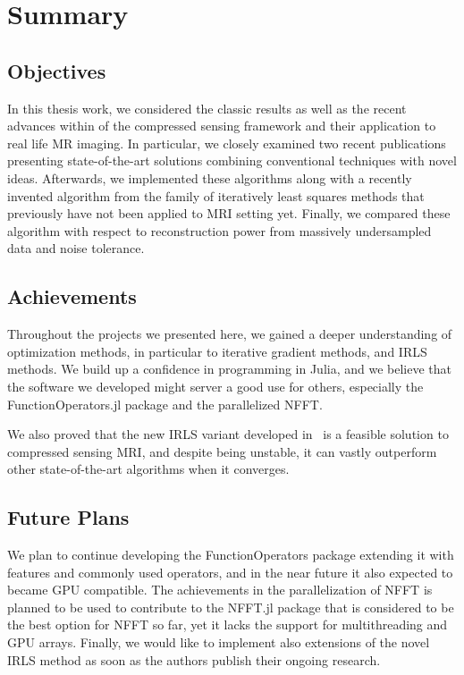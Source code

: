 \chapter{Summary}

\section{Objectives}

In this thesis work, we considered the classic results as well as the recent advances within of the compressed sensing framework and their application to real life MR imaging. In particular, we closely examined two recent publications presenting state-of-the-art solutions combining conventional techniques with novel ideas. Afterwards, we implemented these algorithms along with a recently invented algorithm from the family of iteratively least squares methods that previously have not been applied to MRI setting yet. Finally, we compared these algorithm with respect to reconstruction power from massively undersampled data and noise tolerance.

\section{Achievements}

Throughout the projects we presented here, we gained a deeper understanding of optimization methods, in particular to iterative gradient methods, and IRLS methods. We build up a confidence in programming in Julia, and we believe that the software we developed might server a good use for others, especially the FunctionOperators.jl package and the parallelized NFFT.

We also proved that the new IRLS variant developed in~\cite{kummerle_denoising_2018, kummerle_understanding_nodate} is a feasible solution to compressed sensing MRI, and despite being unstable, it can vastly outperform other state-of-the-art algorithms when it converges.

\section{Future Plans}

We plan to continue developing the FunctionOperators package extending it with features and commonly used operators, and in the near future it also expected to became GPU compatible. The achievements in the parallelization of NFFT is planned to be used to contribute to the NFFT.jl package that is considered to be the best option for NFFT so far, yet it lacks the support for multithreading and GPU arrays. Finally, we would like to implement also extensions of the novel IRLS method as soon as the authors publish their ongoing research.